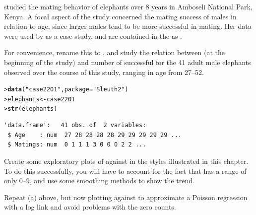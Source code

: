 \documentclass[10pt]{report}\usepackage[]{graphicx}\usepackage[]{color}
\makeatletter
\newcommand{\hlstr}[1]{\textcolor[rgb]{0.192,0.494,0.8}{#1}}%
\newcommand{\hlstd}[1]{\textcolor[rgb]{0.345,0.345,0.345}{#1}}%
\newcommand{\hlkwb}[1]{\textcolor[rgb]{0.69,0.353,0.396}{#1}}%
\newcommand{\hlkwc}[1]{\textcolor[rgb]{0.333,0.667,0.333}{#1}}%
\newcommand{\hlkwd}[1]{\textcolor[rgb]{0.737,0.353,0.396}{\textbf{#1}}}%
\newenvironment{kframe}{%
 \def\at@end@of@kframe{}%
 \ifinner\ifhmode%
  \def\at@end@of@kframe{\end{minipage}}%
  \begin{minipage}{\columnwidth}%
 \fi\fi%
 \def\FrameCommand##1{\hskip\@totalleftmargin \hskip-\fboxsep
 \colorbox{shadecolor}{##1}\hskip-\fboxsep
     \hskip-\linewidth \hskip-\@totalleftmargin \hskip\columnwidth}%
 \MakeFramed {\advance\hsize-\width
   \@totalleftmargin\z@ \linewidth\hsize
   \@setminipage}}%
 {\par\unskip\endMakeFramed%
 \at@end@of@kframe}
\newenvironment{knitrout}{}{} %
\renewenvironment{knitrout}{\small\renewcommand{\baselinestretch}{.85}}{} %
\makeatother
\begin{document}
\begin{Exercises}

  \exercise \citet{Poole:1989} studied the mating behavior of elephants over 8 years in Amboseli National Park,
  Kenya. A focal aspect of the study concerned the mating success of males in relation to age, since larger
  males tend to be more successful in mating.  Her data were used by \citet[]{RamseySchafer:2002} 
  as a case study, and are contained in the  \citep{Sleuth2} as .

  For convenience, rename this to , and study the relation between  
  (at the beginning of the study) and number of successful 
  for the 41 adult male elephants observed over the course of this study, ranging in age from 27--52.
\begin{knitrout}\footnotesize
{}\color{fgcolor}\begin{kframe}
\begin{alltt}
\hlstd{> }\hlkwd{data}\hlstd{(}\hlstr{"case2201"}\hlstd{,} \hlkwc{package}\hlstd{=}\hlstr{"Sleuth2"}\hlstd{)}
\hlstd{> }\hlstd{elephants} \hlkwb{<-} \hlstd{case2201}
\hlstd{> }\hlkwd{str}\hlstd{(elephants)}
\end{alltt}
\begin{verbatim}
'data.frame':	41 obs. of  2 variables:
 $ Age    : num  27 28 28 28 28 29 29 29 29 29 ...
 $ Matings: num  0 1 1 1 3 0 0 0 2 2 ...
\end{verbatim}
\end{kframe}
\end{knitrout}
  \begin{enumerate*}
    \item Create some exploratory plots of  against  in the styles illustrated in this chapter.
    To do this successfully, you will have to account for the fact that  has a range of only
    0--9, and use some smoothing methods to show the trend.
    \begin{ans}
    \end{ans}
    
    \item Repeat (a) above, but now plotting  against  to approximate a
    Poisson regression with a log link and avoid problems with the zero counts.
    \begin{ans}
    \end{ans}
    

\end{enumerate*}
\end{Exercises}
\end{document}
